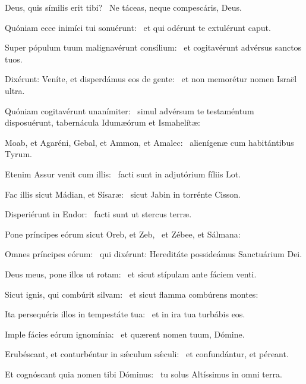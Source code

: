 \item Deus, quis símilis erit tibi?~\psstar{} Ne táceas, neque compescáris, Deus.

\item Quóniam ecce inimíci tui sonuérunt:~\psstar{} et qui odérunt te extulérunt caput.

\item Super pópulum tuum malignavérunt consílium:~\psstar{} et cogitavérunt advérsus sanctos tuos.

\item Dixérunt: Veníte, et disperdámus eos de gente:~\psstar{} et non memorétur nomen Israël ultra.

\item Quóniam cogitavérunt unanímiter:~\psstar{} simul advérsum te testaméntum disposuérunt, tabernácula Idumæórum et Ismahelítæ:

\item Moab, et Agaréni, Gebal, et Ammon, et Amalec:~\psstar{} alienígenæ cum habitántibus Tyrum.

\item Etenim Assur venit cum illis:~\psstar{} facti sunt in adjutórium fíliis Lot.

\item Fac illis sicut Mádian, et Sísaræ:~\psstar{} sicut Jabin in torrénte Cisson.

\item Disperiérunt in Endor:~\psstar{} facti sunt ut stercus terræ.

\item Pone príncipes eórum sicut Oreb, et Zeb,~\psstar{} et Zébee, et Sálmana:

\item Omnes príncipes eórum:~\psstar{} qui dixérunt: Hereditáte possideámus Sanctuárium Dei.

\item Deus meus, pone illos ut rotam:~\psstar{} et sicut stípulam ante fáciem venti.

\item Sicut ignis, qui combúrit silvam:~\psstar{} et sicut flamma combúrens montes:

\item Ita persequéris illos in tempestáte tua:~\psstar{} et in ira tua turbábis eos.

\item Imple fácies eórum ignomínia:~\psstar{} et quærent nomen tuum, Dómine.

\item Erubéscant, et conturbéntur in sǽculum sǽculi:~\psstar{} et confundántur, et péreant.

\item Et cognóscant quia nomen tibi Dóminus:~\psstar{} tu solus Altíssimus in omni terra.